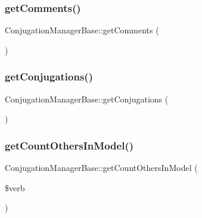 \subsubsection{\texorpdfstring{get\+Comments()}{getComments()}}
{\footnotesize\ttfamily Conjugation\+Manager\+Base\+::get\+Comments (\begin{DoxyParamCaption}{ }\end{DoxyParamCaption})}

\hypertarget{class_conjugation_manager_base_acc0444052a240e9b9afabc6f045f9062}{}\label{class_conjugation_manager_base_acc0444052a240e9b9afabc6f045f9062} 
\subsubsection{\texorpdfstring{get\+Conjugations()}{getConjugations()}}
{\footnotesize\ttfamily Conjugation\+Manager\+Base\+::get\+Conjugations (\begin{DoxyParamCaption}{ }\end{DoxyParamCaption})}

\hypertarget{class_conjugation_manager_base_a170ee674be3f030087e4e77489623e4a}{}\label{class_conjugation_manager_base_a170ee674be3f030087e4e77489623e4a} 
\subsubsection{\texorpdfstring{get\+Count\+Others\+In\+Model()}{getCountOthersInModel()}}
{\footnotesize\ttfamily Conjugation\+Manager\+Base\+::get\+Count\+Others\+In\+Model (\begin{DoxyParamCaption}\item[{}]{\$verb }\end{DoxyParamCaption})}

\hypertarget{class_conjugation_manager_base_a50aa5bd320294aa9683a54dc1b51273f}{}\label{class_conjugation_manager_base_a50aa5bd320294aa9683a54dc1b51273f} 
